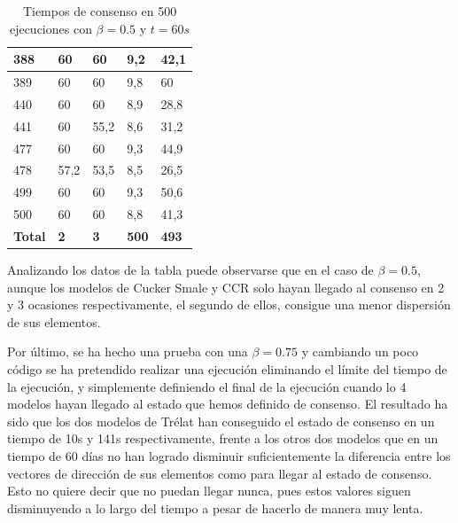 \begin{table}[!h]
\begin{tabular}{|l|l|l|l|l|}
        388 & 60 & 60 & \cellcolor{green!15}9,2 & \cellcolor{green!15}42,1 \\ \hline
        389 & 60 & 60 & \cellcolor{green!15}9,8 & 60 \\ \hline \hline
        440 & 60 & 60 & \cellcolor{green!15}8,9 & \cellcolor{green!15}28,8 \\ \hline
        441 & 60 & \cellcolor{green!15}55,2 & \cellcolor{green!15}8,6 & \cellcolor{green!15}31,2 \\ \hline \hline
        477 & 60 & 60 & \cellcolor{green!15}9,3 & \cellcolor{green!15}44,9 \\ \hline
        478 & \cellcolor{green!15}57,2 & \cellcolor{green!15}53,5 & \cellcolor{green!15}8,5 & \cellcolor{green!15}26,5 \\ \hline \hline
        499 & 60 & 60 & \cellcolor{green!15}9,3 & \cellcolor{green!15}50,6 \\ \hline
        500 & 60 & 60 & \cellcolor{green!15}8,8 & \cellcolor{green!15}41,3 \\ \hline \hline
        \textbf{Total} & \textbf{2} & \textbf{3} & \textbf{500} & \textbf{493} \\ \hline
    \end{tabular}
    \caption{Tiempos de consenso en 500 ejecuciones con $\beta=0.5$ y $t=60s$}
    \label{tab:tiemposConsensoB05}
\end{table}

Analizando los datos de la tabla puede observarse que en el caso de $\beta=0.5$, aunque los modelos de Cucker Smale y CCR solo hayan llegado al consenso en 2 y 3 ocasiones respectivamente, el segundo de ellos, consigue una menor dispersión de sus elementos.

Por último, se ha hecho una prueba con una $\beta=0.75$ y cambiando un poco código se ha pretendido realizar una ejecución eliminando el límite del tiempo de la ejecución, y simplemente definiendo el final de la ejecución cuando lo 4 modelos hayan llegado al estado que hemos definido de consenso. El resultado ha sido que los dos modelos de Trélat han conseguido el estado de consenso en un tiempo de 10s y 141s respectivamente, frente a los otros dos modelos que en un tiempo de 60 días no han logrado disminuir suficientemente la diferencia entre los vectores de dirección de sus elementos como para llegar al estado de consenso. Esto no quiere decir que no puedan llegar nunca, pues estos valores siguen disminuyendo a lo largo del tiempo a pesar de hacerlo de manera muy lenta.